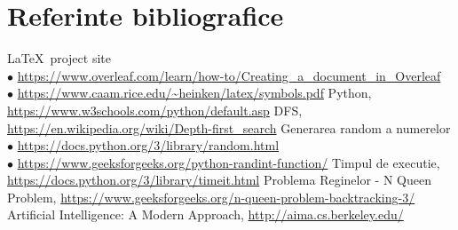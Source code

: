 \documentclass{article}
\begin{document}
\section{Referinte bibliografice}
\vspace{1cm} 
\begin{thebibliography}{9}

      \LaTeX~project site \\
      $\bullet$ \url{https://www.overleaf.com/learn/how-to/Creating_a_document_in_Overleaf} \\
      $\bullet$ \url{https://www.caam.rice.edu/~heinken/latex/symbols.pdf}
      Python, \url{https://www.w3schools.com/python/default.asp}
       DFS, \url{https://en.wikipedia.org/wiki/Depth-first_search}
      Generarea random a numerelor \\ 
       $\bullet$ \url{https://docs.python.org/3/library/random.html}\\
       $\bullet$ \url{https://www.geeksforgeeks.org/python-randint-function/}
      Timpul de executie,
      \url{https://docs.python.org/3/library/timeit.html}
      Problema Reginelor - N Queen Problem, \url{https://www.geeksforgeeks.org/n-queen-problem-backtracking-3/}
     Artificial Intelligence: A Modern Approach,
     \url{http://aima.cs.berkeley.edu/}
      
\end{thebibliography}
\end{document}
